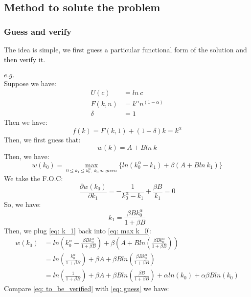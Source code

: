 \documentclass{article}
\begin{document}
\subsection{Method to solute the problem}
\subsubsection{Guess and verify}
The idea is simple, we first guess a particular functional form of the solution and then verify it.\\\\
$e.g.$\\
Suppose we have:
\begin{align*}
	U(c) &= ln\ c\\
	F(k, n) &= k^\alpha n^{(1-\alpha)}\\
	\delta &= 1
\end{align*}
Then we have:
\begin{equation*}
	f(k) = F(k, 1) + (1 - \delta)k = k^\alpha
\end{equation*}
Then, we first guess that:
\begin{equation}
	w(k) = A + Bln\ k
	\label{eq: guess}
\end{equation}
Then, we have:
\begin{equation}
	w(k_0) = \mathop{max}\limits_{0 \leq k_1 \leq k^\alpha_0,\ k_0\ as\ given} \{ ln(k^\alpha_0 - k_1) + \beta (A + Bln\ k_1)\}
	\label{eq: max k_0}
\end{equation}
We take the F.O.C:
\begin{equation*}
	\frac{\partial w(k_0)}{\partial k_1} = -\frac{1}{k^\alpha_0 - k_1} + \frac{\beta B}{k_1} = 0
\end{equation*}
So, we have:
\begin{equation}
	k_1 = \frac{\beta B k^\alpha_0}{1 + \beta B}
	\label{eq: k_1}
\end{equation}
Then, we plug \eqref{eq: k_1} back into \eqref{eq: max k_0}:
\begin{align}
	w(k_0) &= ln(k^\alpha_0 - \frac{\beta B k^\alpha_0}{1 + \beta B}) + \beta (A + Bln(\frac{\beta B k^\alpha_0}{1 + \beta B})) \nonumber\\
	&= ln(\frac{k^\alpha_0}{1 + \beta B}) + \beta A + \beta Bln(\frac{\beta B k^\alpha_0}{1 + \beta B})\\
	&= ln(\frac{1}{1 + \beta B}) + \beta A + \beta B ln(\frac{\beta B}{1 + \beta B}) + \alpha ln(k_0) + \alpha \beta B ln(k_0)
	\label{eq: to_be_verified}
\end{align}
Compare \eqref{eq: to_be_verified} with \eqref{eq: guess} we have:
\end{document}
